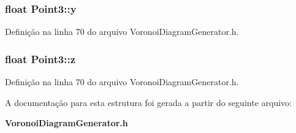 \subsubsection[{y}]{\setlength{\rightskip}{0pt plus 5cm}float Point3\+::y}\label{struct_point3_a9435368d0f1118d35f751aa1d4e4d4e5}


Definição na linha 70 do arquivo Voronoi\+Diagram\+Generator.\+h.

\subsubsection[{z}]{\setlength{\rightskip}{0pt plus 5cm}float Point3\+::z}\label{struct_point3_a56a0faf09fb6bd6602f157c6dd3db7ff}


Definição na linha 70 do arquivo Voronoi\+Diagram\+Generator.\+h.



A documentação para esta estrutura foi gerada a partir do seguinte arquivo\+:\begin{DoxyCompactItemize}
\item 
{\bf Voronoi\+Diagram\+Generator.\+h}\end{DoxyCompactItemize}
